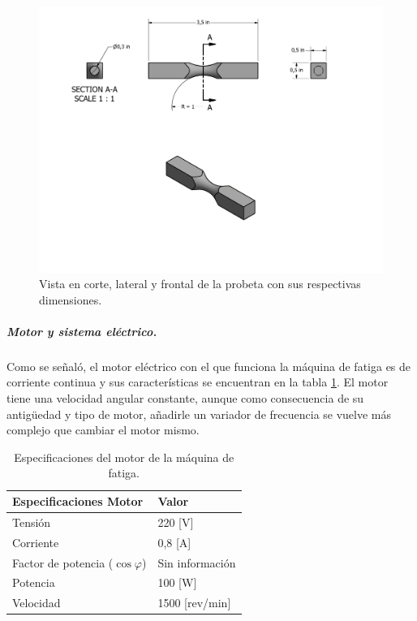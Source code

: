 \begin{figure}[H]
\centering
\includegraphics[width=1\linewidth, trim={2cm 13cm 4cm 1cm},clip]{Imagenes/Probeta.pdf}
\caption{Vista en corte, lateral y frontal de la probeta con sus respectivas dimensiones.}
\label{fig:probeta}
\end{figure} 
 
\subparagraph{Motor y sistema eléctrico.}
Como se señaló, el motor eléctrico con el que funciona la máquina de fatiga es de corriente continua y sus características se encuentran en la tabla \ref{tab:motor_maq}. El motor tiene una velocidad angular constante, aunque como consecuencia de su antigüedad y tipo de motor, añadirle un variador de frecuencia se vuelve más complejo que cambiar el motor mismo. 

\begin{table}[h]
\centering
\begin{tabular}{ll}
\hline
Especificaciones Motor                            & Valor   				\\ \hline
Tensión                                           & 220 {[}V{]}        		\\
Corriente                                         & 0,8 {[}A{]}        		\\
Factor de potencia ($\cos \varphi$)				  & Sin información    		\\
Potencia                                          & 100 {[}W{]}        		\\
Velocidad                                         & 1500 {[}rev/min{]} 		\\ \hline
\end{tabular}
\caption{Especificaciones del motor de la máquina de fatiga.}
\label{tab:motor_maq}
\end{table}
 
